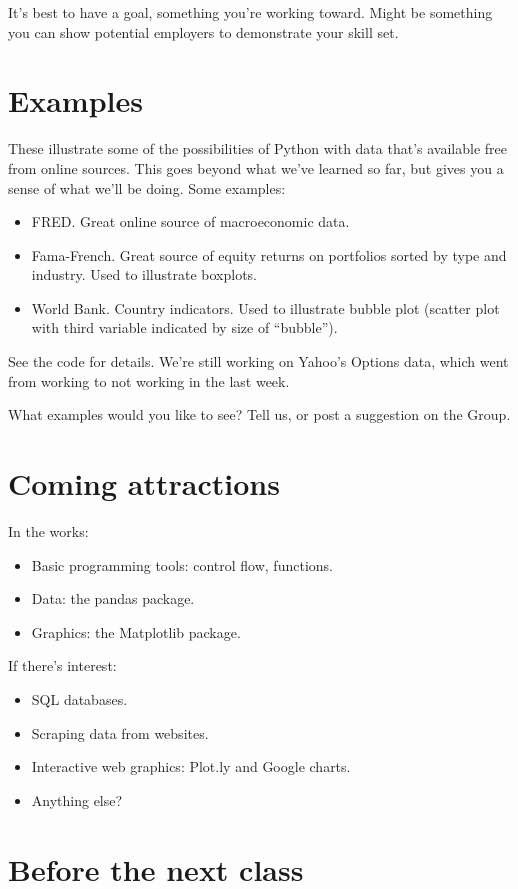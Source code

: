 \documentclass[11pt]{article}
\begin{document}
It's best to have a goal, something you're working toward.
Might be something you can show potential employers to
demonstrate your skill set.


\section{Examples}

These illustrate some of the possibilities of Python
with data that's available free from online sources.
This goes beyond what we've learned so far, but gives you a sense
of what we'll be doing.
Some examples:
\begin{itemize}
\item FRED.  Great online source of macroeconomic data.
\item Fama-French.  Great source of equity returns on portfolios sorted by type and industry.
Used to illustrate boxplots.
\item World Bank.  Country indicators. Used to illustrate bubble plot (scatter plot with third variable
indicated by size of ``bubble'').
\end{itemize}
See the code for details.
We're still working on Yahoo's Options data,
which went from working to not working in the last week.

What examples would you like to see?
Tell us, or post a suggestion on the Group.


\section{Coming attractions}

In the works:
\begin{itemize}
\item Basic programming tools:  control flow, functions.
\item Data:  the pandas package.
\item Graphics:  the Matplotlib package.
\end{itemize}

If there's interest:
\begin{itemize}
\item SQL databases.
\item Scraping data from websites.
\item Interactive web graphics:  Plot.ly and Google charts.
\item Anything else?
\end{itemize}

\section{Before the next class}
\end{document}
